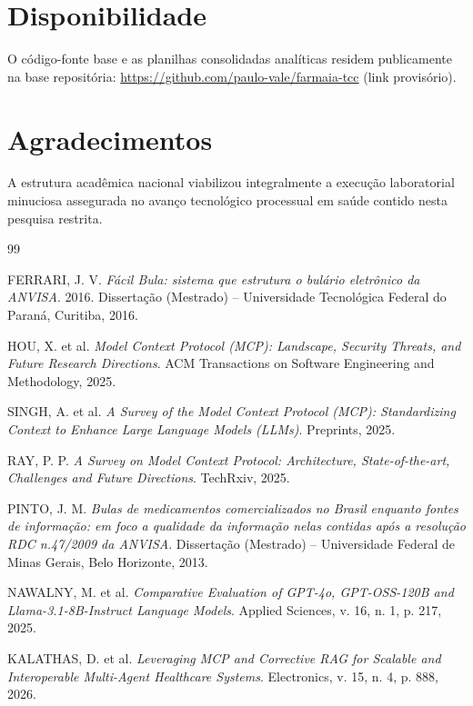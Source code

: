 \documentclass[12pt]{article}
\begin{document}
\section*{Disponibilidade}
O código-fonte base e as planilhas consolidadas analíticas residem publicamente na base repositória: \url{https://github.com/paulo-vale/farmaia-tcc} (link provisório).

\section*{Agradecimentos}
A estrutura acadêmica nacional viabilizou integralmente a execução laboratorial minuciosa assegurada no avanço tecnológico processual em saúde contido nesta pesquisa restrita.

\begin{thebibliography}{99}

FERRARI, J. V. \textit{Fácil Bula: sistema que estrutura o bulário eletrônico da ANVISA}. 2016. Dissertação (Mestrado) -- Universidade Tecnológica Federal do Paraná, Curitiba, 2016.

HOU, X. et al. \textit{Model Context Protocol (MCP): Landscape, Security Threats, and Future Research Directions}. ACM Transactions on Software Engineering and Methodology, 2025.

SINGH, A. et al. \textit{A Survey of the Model Context Protocol (MCP): Standardizing Context to Enhance Large Language Models (LLMs)}. Preprints, 2025.

RAY, P. P. \textit{A Survey on Model Context Protocol: Architecture, State-of-the-art, Challenges and Future Directions}. TechRxiv, 2025.

PINTO, J. M. \textit{Bulas de medicamentos comercializados no Brasil enquanto fontes de informação: em foco a qualidade da informação nelas contidas após a resolução RDC n.47/2009 da ANVISA}. Dissertação (Mestrado) -- Universidade Federal de Minas Gerais, Belo Horizonte, 2013.

NAWALNY, M. et al. \textit{Comparative Evaluation of GPT-4o, GPT-OSS-120B and Llama-3.1-8B-Instruct Language Models}. Applied Sciences, v. 16, n. 1, p. 217, 2025.

KALATHAS, D. et al. \textit{Leveraging MCP and Corrective RAG for Scalable and Interoperable Multi-Agent Healthcare Systems}. Electronics, v. 15, n. 4, p. 888, 2026.


\end{thebibliography}
\end{document}
